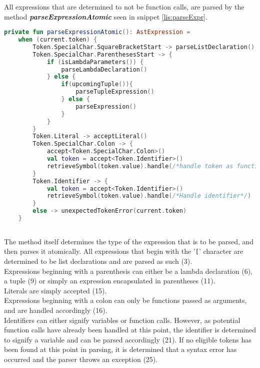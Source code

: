 All expressions that are determined to not be function calls, are parsed by the method \textbf{\textit{parseExpressionAtomic}} seen in snippet \ref{lis:parseExpr}.

\begin{lstlisting}[language=Kotlin,label=lis:parseExpr,caption=A simplified version of the parseExpressionAtomic method from the parser.]
private fun parseExpressionAtomic(): AstExpression =
    when (current.token) {
        Token.SpecialChar.SquareBracketStart -> parseListDeclaration()
        Token.SpecialChar.ParenthesesStart -> {
            if (isLambdaParameters()) {
                parseLambdaDeclaration()
            } else {
                if(upcomingTuple()){
                    parseTupleExpression()
                } else {
                    parseExpression()
                }
            }
        }
        Token.Literal -> acceptLiteral()
        Token.SpecialChar.Colon -> {
        	accept<Token.SpecialChar.Colon>()
        	val token = accept<Token.Identifier>()
        	retrieveSymbol(token.value).handle(/*handle token as function*/)
        }
        Token.Identifier -> {
            val token = accept<Token.Identifier>()
            retrieveSymbol(token.value).handle(/*Handle identifier*/)
        }
        else -> unexpectedTokenError(current.token)
    }
            
\end{lstlisting}

The method itself determines the type of the expression that is to be parsed, and then parses it atomically.
All expressions that begin with the '\texttt{[}' character are determined to be list declarations and are parsed as such (3).\\
Expressions beginning with a parenthesis can either be a lambda declaration (6), a tuple (9) or simply an expression encapsulated in parentheses (11).\\
Literals are simply accepted (15).\\
Expressions beginning with a colon can only be functions passed as arguments, and are handled accordingly (16).\\
Identifiers can either signify variables or function calls.
However, as potential function calls have already been handled at this point, the identifier is determined to signify a variable and can be parsed accordingly (21).
If no eligible tokens has been found at this point in parsing, it is determined that a syntax error has occurred and the parser throws an exception (25).


